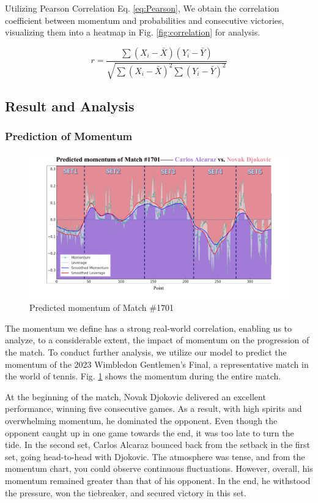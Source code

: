 \documentclass{mcmthesis}
\begin{document}
Utilizing Pearson Correlation Eq. \ref{eq:Pearson}, We obtain the correlation coefficient between momentum and probabilities and consecutive victories, visualizing them into a heatmap in Fig. \ref{fig:correlation} for analysis.

\begin{equation} 
\label{eq:Pearson}
r = \frac{\sum (X_i - \bar{X})(Y_i - \bar{Y})}{\sqrt{\sum (X_i - \bar{X})^2 \sum (Y_i - \bar{Y})^2}}
\end{equation}
\subsection{Result and Analysis}
\subsubsection{Prediction of Momentum}

\begin{figure}[ht]
    \centering
    \begin{minipage}{\textwidth}
        \centering
        \includegraphics[width=1\textwidth]{figures/Momentum_Predication.pdf} 
        \caption{Predicted momentum of Match \#1701}
        \label{fig:Momentum_Predication}
    \end{minipage}
\end{figure}
The momentum we define has a strong real-world correlation, enabling us to analyze, to a considerable extent, the impact of momentum on the progression of the match. To conduct further analysis, we utilize our model to predict the momentum of the 2023 Wimbledon Gentlemen’s Final, a representative match in the world of tennis. Fig. \ref{fig:Momentum_Predication} shows the momentum during the entire match. 

At the beginning of the match, Novak Djokovic delivered an excellent performance, winning five consecutive games. As a result, with high spirits and overwhelming momentum, he dominated the opponent. Even though the opponent caught up in one game towards the end, it was too late to turn the tide. In the second set, Carlos Alcaraz bounced back from the setback in the first set, going head-to-head with Djokovic. The atmosphere was tense, and from the momentum chart, you could observe continuous fluctuations. However, overall, his momentum remained greater than that of his opponent. In the end, he withstood the pressure, won the tiebreaker, and secured victory in this set. 
\end{document}
